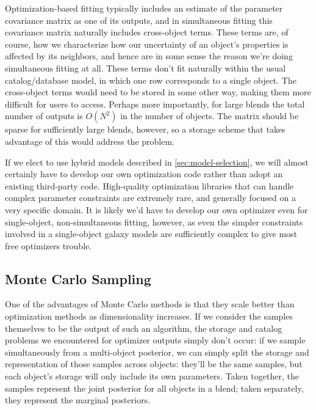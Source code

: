 \documentclass[10pt]{article}
\begin{document}
Optimization-based fitting typically includes an estimate of the parameter
covariance matrix as one of its outputs, and in simultaneous fitting this
covariance matrix naturally includes cross-object terms.  These terms are, of
course, how we characterize how our uncertainty of an object's properties is
affected by its neighbors, and hence are in some sense the reason we're doing
simultaneous fitting at all.  These terms don't fit naturally within the
usual catalog/database model, in which one row corresponds to a single object.
The cross-object terms would need to be stored in some other way, making them
more difficult for users to access.  Perhaps more importantly, for large
blends the total number of outputs is $O(N^2)$ in the number of objects.  The
matrix should be sparse for sufficiently large blends, however, so a storage
scheme that takes advantage of this would address the problem.

If we elect to use hybrid models described in \ref{sec:model-selection}, we
will almost certainly have to develop our own optimization code rather than
adopt an existing third-party code.  High-quality optimization libraries that
can handle complex parameter constraints are extremely rare, and generally
focused on a very specific domain.  It is likely we'd have to develop our own
optimizer even for single-object, non-simultaneous fitting, however, as even
the simpler constraints involved in a single-object galaxy models are
sufficiently complex to give most free optimizers trouble.

\subsection{Monte Carlo Sampling}

\label{sec:sampling}

One of the advantages of Monte Carlo methods is that they scale better than
optimization methods as dimensionality increases.  If we consider the samples
themselves to be the output of such an algorithm, the storage and catalog
problems we encountered for optimizer outputs simply don't occur: if we sample
simultaneously from a multi-object posterior, we can simply split the storage
and representation of those samples across objects: they'll be the same
samples, but each object's storage will only include its own parameters.
Taken together, the samples represent the joint posterior for all objects in
a blend; taken separately, they represent the marginal posteriors.
\end{document}
